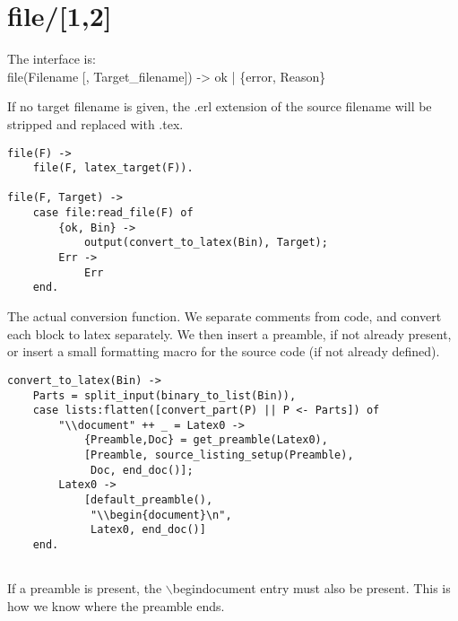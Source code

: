 \documentclass[a4paper,12pt]{article}
\newenvironment{mylisting}
{\begin{list}{}{\setlength{\leftmargin}{1em}}\item\scriptsize\bfseries}
{\end{list}}
\begin{document}
\section{file/[1,2]}

The interface is:\\
file(Filename [, Target\_filename]) -> ok | \{error, Reason\}

If no target filename is given, the .erl extension of the source filename
will be stripped and replaced with .tex.


\begin{mylisting}
\begin{verbatim}
file(F) ->
    file(F, latex_target(F)).

file(F, Target) ->
    case file:read_file(F) of
        {ok, Bin} ->
            output(convert_to_latex(Bin), Target);
        Err ->
            Err
    end.

\end{verbatim}
\end{mylisting}

The actual conversion function. We separate comments from code,
and convert each block to latex separately. We then insert a preamble,
if not already present, or insert a small formatting macro for the 
source code (if not already defined).


\begin{mylisting}
\begin{verbatim}
convert_to_latex(Bin) ->
    Parts = split_input(binary_to_list(Bin)),
    case lists:flatten([convert_part(P) || P <- Parts]) of
        "\\document" ++ _ = Latex0 ->
            {Preamble,Doc} = get_preamble(Latex0),
            [Preamble, source_listing_setup(Preamble),
             Doc, end_doc()];
        Latex0 ->
            [default_preamble(),
             "\\begin{document}\n",
             Latex0, end_doc()]
    end.


\end{verbatim}
\end{mylisting}

If a preamble is present, the $\backslash$begin{document} entry
must also be present. This is how we know where the preamble ends.
\end{document}

